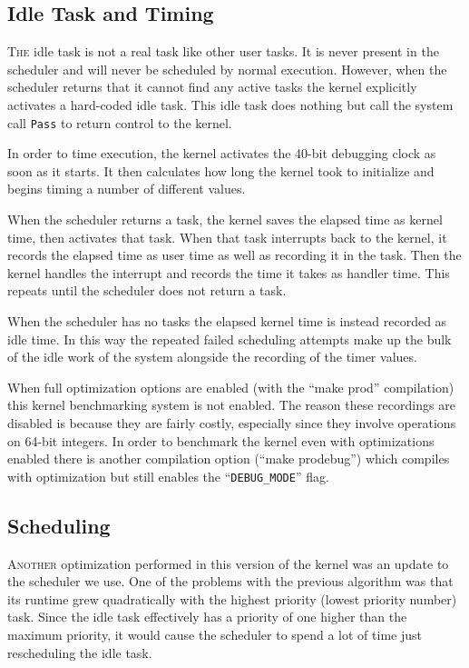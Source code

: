 \documentclass{article}
\begin{document}
\subsection*{Idle Task and Timing}

\textsc{The} idle task is not a real task like other user tasks. It is never
present in the scheduler and will never be scheduled by normal execution.
However, when the scheduler returns that it cannot find any active tasks the
kernel explicitly activates a hard-coded idle task. This idle task does nothing
but call the system call \texttt{Pass} to return control to the kernel.

In order to time execution, the kernel activates the 40-bit debugging clock as
soon as it starts. It then calculates how long the kernel took to initialize and
begins timing a number of different values.

When the scheduler returns a task, the kernel saves the elapsed time as kernel
time, then activates that task. When that task interrupts back to the kernel, it
records the elapsed time as user time as well as recording it in the task. Then
the kernel handles the interrupt and records the time it takes as handler time.
This repeats until the scheduler does not return a task.

When the scheduler has no tasks the elapsed kernel time is instead recorded as
idle time. In this way the repeated failed scheduling attempts make up the bulk
of the idle work of the system alongside the recording of the timer values.

When full optimization options are enabled (with the ``make prod'' compilation)
this kernel benchmarking system is not enabled. The reason these recordings are
disabled is because they are fairly costly, especially since they involve
operations on 64-bit integers. In order to benchmark the kernel even with
optimizations enabled there is another compilation option (``make prodebug'')
which compiles with optimization but still enables the ``\texttt{DEBUG\_MODE}''
flag.

\subsection*{Scheduling}

\textsc{Another} optimization performed in this version of the kernel was an
update to the scheduler we use. One of the problems with the previous algorithm
was that its runtime grew quadratically with the highest priority (lowest
priority number) task. Since the idle task effectively has a priority of one
higher than the maximum priority, it would cause the scheduler to spend a lot of
time just rescheduling the idle task.
\end{document}
